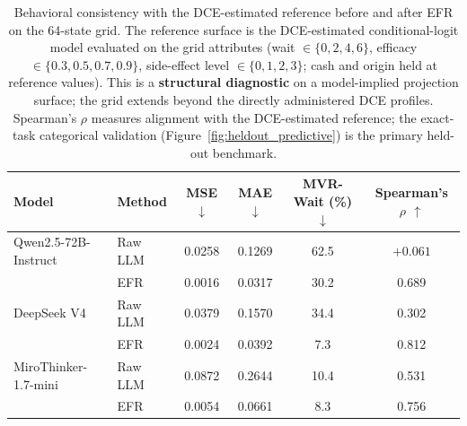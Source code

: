 \documentclass[11pt]{article}
\begin{document}
\begin{table}[t]
\centering
\caption{Behavioral consistency with the DCE-estimated reference before and after EFR on the 64-state grid. The reference surface is the DCE-estimated conditional-logit model evaluated on the grid attributes (wait $\in \{0,2,4,6\}$, efficacy $\in \{0.3,0.5,0.7,0.9\}$, side-effect level $\in \{0,1,2,3\}$; cash and origin held at reference values). This is a \textbf{structural diagnostic} on a model-implied projection surface; the grid extends beyond the directly administered DCE profiles. Spearman's $\rho$ measures alignment with the DCE-estimated reference; the exact-task categorical validation (Figure~\ref{fig:heldout_predictive}) is the primary held-out benchmark.}
\label{tab:behavioral_alignment}

\begin{tabular}{llcccc}
\toprule
Model & Method & MSE $\downarrow$ & MAE $\downarrow$ & MVR-Wait (\%) $\downarrow$ & Spearman's $\rho$ $\uparrow$\\
\midrule

Qwen2.5-72B-Instruct
& Raw LLM
& 0.0258
& 0.1269
& 62.5
& $+0.061$ \\

& EFR
& 0.0016
& 0.0317
& 30.2
& 0.689 \\

\addlinespace

DeepSeek V4
& Raw LLM
& 0.0379
& 0.1570
& 34.4
& 0.302 \\

& EFR
& 0.0024
& 0.0392
& 7.3
& 0.812 \\

\addlinespace

MiroThinker-1.7-mini
& Raw LLM
& 0.0872
& 0.2644
& 10.4
& 0.531 \\

& EFR
& 0.0054
& 0.0661
& 8.3
& 0.756 \\

\bottomrule
\end{tabular}
\end{table}
\end{document}
